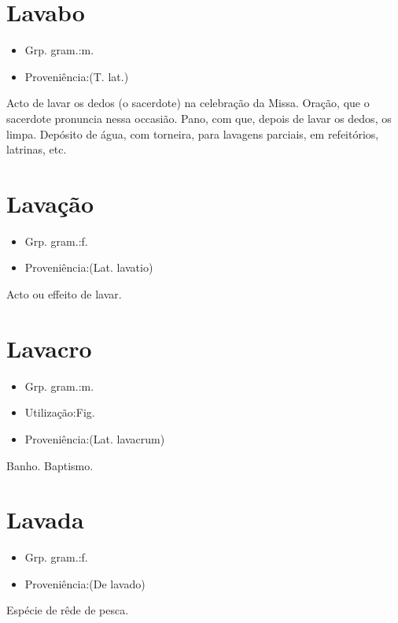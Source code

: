 \section{Lavabo}
\begin{itemize}
\item {Grp. gram.:m.}
\end{itemize}
\begin{itemize}
\item {Proveniência:(T. lat.)}
\end{itemize}
Acto de lavar os dedos (o sacerdote) na celebração da Missa.
Oração, que o sacerdote pronuncia nessa occasião.
Pano, com que, depois de lavar os dedos, os limpa.
Depósito de água, com torneira, para lavagens parciais, em refeitórios, latrinas, etc.
\section{Lavação}
\begin{itemize}
\item {Grp. gram.:f.}
\end{itemize}
\begin{itemize}
\item {Proveniência:(Lat. \textunderscore lavatio\textunderscore )}
\end{itemize}
Acto ou effeito de lavar.
\section{Lavacro}
\begin{itemize}
\item {Grp. gram.:m.}
\end{itemize}
\begin{itemize}
\item {Utilização:Fig.}
\end{itemize}
\begin{itemize}
\item {Proveniência:(Lat. \textunderscore lavacrum\textunderscore )}
\end{itemize}
Banho.
Baptismo.
\section{Lavada}
\begin{itemize}
\item {Grp. gram.:f.}
\end{itemize}
\begin{itemize}
\item {Proveniência:(De \textunderscore lavado\textunderscore )}
\end{itemize}
Espécie de rêde de pesca.
